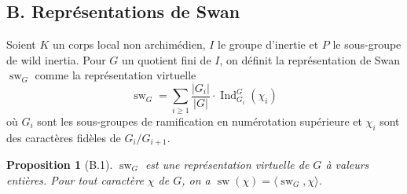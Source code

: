 \documentclass[11pt]{amsart}
\theoremstyle{plain}
\newtheorem{proposition}[theorem]{Proposition}
\theoremstyle{definition}
\DeclareMathOperator{\Ind}{Ind}
\DeclareMathOperator{\sw}{sw}
\begin{document}
\subsection*{B. Repr\'esentations de Swan}

Soient $K$ un corps local non archim\'edien, $I$ le groupe d'inertie et $P$ le sous-groupe de wild inertia. Pour $G$ un quotient fini de $I$, on d\'efinit la repr\'esentation de Swan $\sw_G$ comme la repr\'esentation virtuelle
\[
\sw_G = \sum_{i \geq 1} \frac{|G_i|}{|G|} \cdot \Ind_{G_i}^G(\chi_i)
\]
o\`u $G_i$ sont les sous-groupes de ramification en num\'erotation sup\'erieure et $\chi_i$ sont des caract\`eres fid\`eles de $G_i/G_{i+1}$.

\begin{proposition}[B.1]
$\sw_G$ est une repr\'esentation virtuelle de $G$ \`a valeurs enti\`eres. Pour tout caract\`ere $\chi$ de $G$, on a $\sw(\chi) = \langle \sw_G, \chi \rangle$.
\end{proposition}
\end{document}
